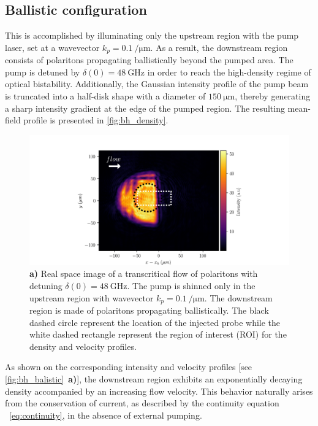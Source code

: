 \subsection{Ballistic configuration}

This is accomplished by illuminating only the upstream region with the pump laser, set at a wavevector \(k_p = \SI{0.1}{\per \micro \meter}\). As a result, the downstream region consists of polaritons propagating ballistically beyond the pumped area.
The pump is detuned by \(\delta(0) = \SI{48}{\giga \hertz}\) in order to reach the high-density regime of optical bistability. Additionally, the Gaussian intensity profile of the pump beam is truncated into a half-disk shape with a diameter of \(\SI{150}{\micro \meter}\), thereby generating a sharp intensity gradient at the edge of the pumped region. 
The resulting mean-field profile is presented in \autoref{fig:bh_density}.

\begin{figure}[htbp]
    \centering
    \includegraphics[width=1\textwidth]{chap_stimulated_hawking/fig/bh_density.pdf}
    \caption{\textbf{a)} Real space image of a transcritical flow of polaritons with detuning $\delta(0)=\SI{48}{\giga\hertz}$. The pump is shinned only 
    in the upstream region with wavevector $k_p=\SI{0.1}{\per \micro \meter}$.
    The downstream region is made of polaritons propagating ballistically. The black dashed circle represent the location of the injected probe while the white dashed rectangle represent the region 
    of interest (ROI) for the density and velocity profiles. }
    \label{fig:bh_density}
\end{figure}

As shown on the corresponding intensity and velocity profiles [see \autoref{fig:bh_balistic}~\textbf{a)}], the downstream region exhibits an exponentially decaying density accompanied by an increasing flow velocity. 
This behavior naturally arises from the conservation of current, as described by the continuity equation ~\ref{eq:continuity}, in the absence of external pumping.

